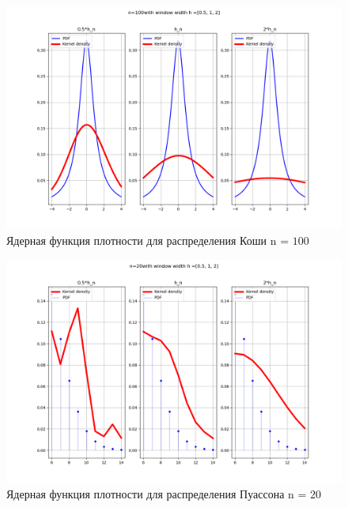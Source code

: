 \documentclass[a4]{article}
\begin{document}
\begin{center}
	\begin{figure}[H]
		\caption{Ядерная функция плотности для распределения Коши n = $100$ }
		\includegraphics[width=\textwidth]{Lab4_cauchy_pdf_100.png} 
	\end{figure}
	
	\begin{figure}[H]
		\caption{Ядерная функция плотности для распределения Пуассона n = $20$}
		\includegraphics[width=\textwidth]{Lab4_poisson_pdf_20.png} 
	\end{figure}
	

\end{center}
\end{document}
